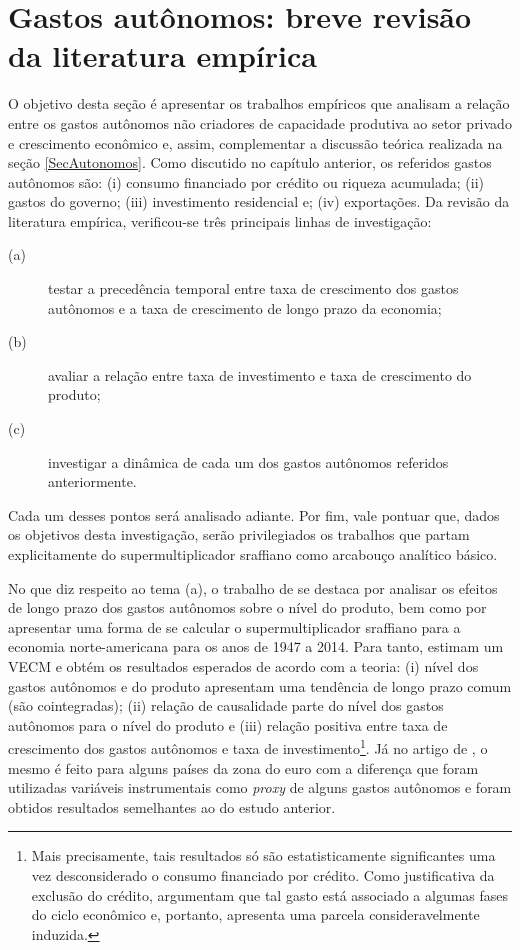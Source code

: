 \section{Gastos autônomos: breve revisão da literatura empírica}
\label{RevF}

O objetivo desta seção é apresentar os trabalhos empíricos que analisam a relação entre os gastos autônomos não criadores de capacidade produtiva ao setor privado e crescimento econômico e, assim, complementar a discussão teórica realizada na seção \ref{SecAutonomos}. Como discutido no capítulo anterior, os referidos gastos autônomos são:
(i) consumo financiado por crédito ou riqueza acumulada;
(ii) gastos do governo;
(iii) investimento residencial e;
(iv) exportações. 
Da revisão da literatura empírica, verificou-se três principais linhas de investigação: 
\begin{description}
	\item[(a)] testar a precedência temporal entre taxa de crescimento dos gastos autônomos e a taxa de crescimento de longo prazo da economia; 
	\item[(b)] avaliar a relação entre taxa de investimento e taxa de crescimento do produto;
	\item[(c)] investigar a dinâmica de cada um dos gastos autônomos referidos anteriormente.
\end{description}
Cada um desses pontos será analisado adiante. Por fim, vale pontuar que, dados os objetivos desta investigação, serão privilegiados os trabalhos que partam explicitamente do supermultiplicador sraffiano como arcabouço analítico básico.

No que diz respeito ao tema (a), o trabalho de \textcite{girardi_long-run_2016} se destaca por analisar os efeitos de longo prazo dos gastos autônomos sobre  o nível do produto, bem como por apresentar uma forma de se calcular o supermultiplicador sraffiano para a economia norte-americana para os anos de 1947 a 2014. Para tanto, estimam um VECM e obtém os resultados esperados de acordo com a teoria: (i) nível dos gastos autônomos e do produto apresentam uma tendência de longo prazo comum  (são cointegradas); (ii) relação de causalidade parte do nível dos gastos autônomos para o nível do produto e (iii) relação positiva entre taxa de crescimento dos gastos autônomos e taxa de investimento\footnote{
	Mais precisamente, tais resultados só são estatisticamente significantes uma vez desconsiderado o consumo financiado por crédito. Como justificativa da exclusão do crédito, \textcite[p.~13]{girardi_long-run_2016} argumentam que tal gasto está associado a algumas fases do ciclo econômico e, portanto, apresenta uma parcela consideravelmente induzida.
}. Já no artigo de \textcite{girardi_autonomous_2018}, o mesmo é feito para alguns países da zona do euro com a diferença que foram utilizadas variáveis instrumentais como \textit{proxy} de alguns gastos autônomos e foram obtidos resultados semelhantes ao do estudo anterior. 

